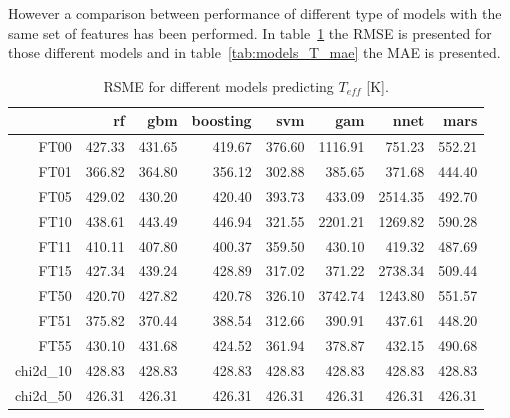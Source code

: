 However a comparison between performance of different type of models with the same
set of features has been performed. In table~\ref{tab:models_T_rmse} the RMSE is presented for 
those different models and in table~\ref{tab:models_T_mae} the MAE is presented.

\begin{table}[ht]
\centering
\begin{tabular}{rrrrrrrr}
  \hline
 & rf & gbm & boosting & svm & gam & nnet & mars \\ 
  \hline
  FT00 & 427.33 & 431.65 & 419.67 & 376.60 & 1116.91 & 751.23 & 552.21 \\ 
  FT01 & 366.82 & 364.80 & 356.12 & 302.88 & 385.65 & 371.68 & 444.40 \\ 
  FT05 & 429.02 & 430.20 & 420.40 & 393.73 & 433.09 & 2514.35 & 492.70 \\ 
  FT10 & 438.61 & 443.49 & 446.94 & 321.55 & 2201.21 & 1269.82 & 590.28 \\ 
  FT11 & 410.11 & 407.80 & 400.37 & 359.50 & 430.10 & 419.32 & 487.69 \\ 
  FT15 & 427.34 & 439.24 & 428.89 & 317.02 & 371.22 & 2738.34 & 509.44 \\ 
  FT50 & 420.70 & 427.82 & 420.78 & 326.10 & 3742.74 & 1243.80 & 551.57 \\ 
  FT51 & 375.82 & 370.44 & 388.54 & 312.66 & 390.91 & 437.61 & 448.20 \\ 
  FT55 & 430.10 & 431.68 & 424.52 & 361.94 & 378.87 & 432.15 & 490.68 \\ 
  chi2d\_10 & 428.83 & 428.83 & 428.83 & 428.83 & 428.83 & 428.83 & 428.83 \\ 
  chi2d\_50 & 426.31 & 426.31 & 426.31 & 426.31 & 426.31 & 426.31 & 426.31 \\ 
   \hline
\end{tabular}
\caption { RSME for different models predicting $T_{eff}$ [K].} 
\label{tab:models_T_rmse} 
\end{table}


